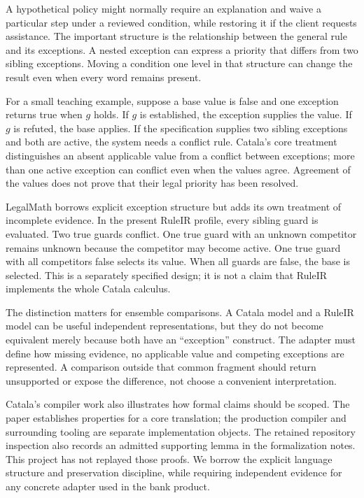 \documentclass[12pt,a4paper,oneside,openany]{book}
\begin{document}
A hypothetical policy might normally require an explanation and waive a
particular step under a reviewed condition, while restoring it if the client
requests assistance. The important structure is the relationship between
the general rule and its exceptions. A nested exception can express a priority
that differs from two sibling exceptions. Moving a condition one level in
that structure can change the result even when every word remains present.

For a small teaching example, suppose a base value is false and one exception
returns true when $g$ holds. If $g$ is established, the exception supplies the
value. If $g$ is refuted, the base applies. If the specification supplies two
sibling exceptions and both are active, the system needs a conflict rule.
Catala's core treatment distinguishes an absent applicable value from a
conflict between exceptions; more than one active exception can conflict even
when the values agree. Agreement of the values does not prove that their
legal priority has been resolved.

LegalMath borrows explicit exception structure but adds its own treatment of
incomplete evidence. In the present RuleIR profile, every sibling guard is
evaluated. Two true guards conflict. One true guard with an unknown competitor
remains unknown because the competitor may become active. One true guard with
all competitors false selects its value. When all guards are false, the base
is selected. This is a separately specified design; it is not a claim that
RuleIR implements the whole Catala calculus.

The distinction matters for ensemble comparisons. A Catala model and a RuleIR
model can be useful independent representations, but they do not become
equivalent merely because both have an ``exception'' construct. The adapter
must define how missing evidence, no applicable value and competing exceptions
are represented. A comparison outside that common fragment should return
unsupported or expose the difference, not choose a convenient interpretation.

Catala's compiler work also illustrates how formal claims should be scoped.
The paper establishes properties for a core translation; the production
compiler and surrounding tooling are separate implementation objects. The
retained repository inspection also records an admitted supporting lemma in
the formalization notes. This project has not replayed those proofs. We borrow
the explicit language structure and preservation discipline, while requiring
independent evidence for any concrete adapter used in the bank product.
\end{document}

